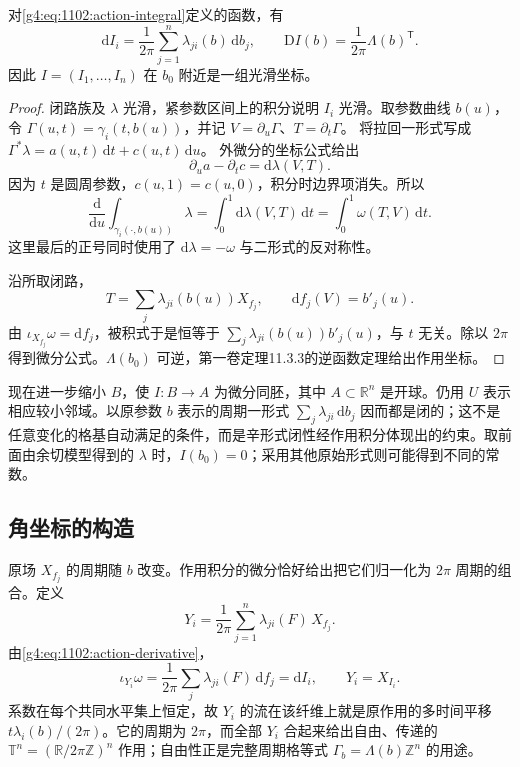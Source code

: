 \begin{proposition}\label{g4:prop:1102:action-derivative}
	对\eqref{g4:eq:1102:action-integral}定义的函数，有
	\begin{equation}\label{g4:eq:1102:action-derivative}
		\mathrm{d}I_i=\frac1{2\pi}\sum_{j=1}^n\lambda_{ji}(b)\,\mathrm{d}b_j,
		\qquad
		\mathrm{D}I(b)=\frac1{2\pi}\Lambda(b)^{\mathsf T}.
	\end{equation}
	因此 \(I=(I_1,\ldots,I_n)\) 在 \(b_0\) 附近是一组光滑坐标。
\end{proposition}
\begin{proof}
	闭路族及 \(\lambda\) 光滑，紧参数区间上的积分说明 \(I_i\) 光滑。取参数曲线 \(b(u)\)，令
	\(\Gamma(u,t)=\gamma_i(t,b(u))\)，并记
	\(V=\partial_u\Gamma\)、\(T=\partial_t\Gamma\)。
	将拉回一形式写成
	\(\Gamma^*\lambda=a(u,t)\,\mathrm{d}t+c(u,t)\,\mathrm{d}u\)。
	外微分的坐标公式给出
	\[
		\partial_u a-\partial_t c
		=\mathrm{d}\lambda(V,T).
	\]
	因为 \(t\) 是圆周参数，\(c(u,1)=c(u,0)\)，积分时边界项消失。所以
	\[
		\frac{\mathrm{d}}{\mathrm{d}u}\int_{\gamma_i(\cdot,b(u))}\lambda
		=\int_0^1\mathrm{d}\lambda(V,T)\,\mathrm{d}t
		=\int_0^1\omega(T,V)\,\mathrm{d}t.
	\]
	这里最后的正号同时使用了 \(\mathrm{d}\lambda=-\omega\) 与二形式的反对称性。

	沿所取闭路，
	\[
		T=\sum_j\lambda_{ji}(b(u))X_{f_j},\qquad
		\mathrm{d}f_j(V)=b'_j(u).
	\]
	由 \(\iota_{X_{f_j}}\omega=\mathrm{d}f_j\)，被积式于是恒等于
	\(\sum_j\lambda_{ji}(b(u))b'_j(u)\)，与 \(t\) 无关。除以 \(2\pi\) 得到微分公式。\(\Lambda(b_0)\) 可逆，第一卷定理11.3.3的逆函数定理给出作用坐标。
\end{proof}

现在进一步缩小 \(B\)，使 \(I:B\to A\) 为微分同胚，其中 \(A\subset\mathbb R^n\) 是开球。仍用 \(U\) 表示相应较小邻域。以原参数 \(b\) 表示的周期一形式
\(\sum_j\lambda_{ji}\,\mathrm{d}b_j\) 因而都是闭的；这不是任意变化的格基自动满足的条件，而是辛形式闭性经作用积分体现出的约束。取前面由余切模型得到的 \(\lambda\) 时，\(I(b_0)=0\)；采用其他原始形式则可能得到不同的常数。

\subsection{角坐标的构造}
\label{g4:subsec:1102:03}

原场 \(X_{f_j}\) 的周期随 \(b\) 改变。作用积分的微分恰好给出把它们归一化为 \(2\pi\) 周期的组合。定义
\begin{equation}\label{g4:eq:1102:normalized-fields}
	Y_i=\frac1{2\pi}\sum_{j=1}^n\lambda_{ji}(F)\,X_{f_j}.
\end{equation}
由\eqref{g4:eq:1102:action-derivative}，
\[
	\iota_{Y_i}\omega
	=\frac1{2\pi}\sum_j\lambda_{ji}(F)\,\mathrm{d}f_j
	=\mathrm{d}I_i,
	\qquad Y_i=X_{I_i}.
\]
系数在每个共同水平集上恒定，故 \(Y_i\) 的流在该纤维上就是原作用的多时间平移 \(t\lambda_i(b)/(2\pi)\)。它的周期为 \(2\pi\)，而全部 \(Y_i\) 合起来给出自由、传递的
\(\mathbb T^n=(\mathbb R/2\pi\mathbb Z)^n\) 作用；自由性正是完整周期格等式 \(\Gamma_b=\Lambda(b)\mathbb Z^n\) 的用途。

